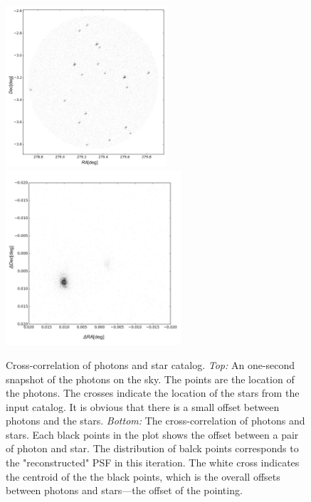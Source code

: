 \documentclass[12pt, preprint]{aastex}
\begin{document}
\begin{figure}[p]
\begin{center}
\includegraphics[width=0.535\textwidth]{figures/photons600-new}
\includegraphics[width=0.58\textwidth]{figures/co600-new}
\end{center}
\caption{%
  \label{slice}
  Cross-correlation of photons and star catalog.
  \emph{Top:}  An one-second snapshot of the photons on the sky. The points are the location of the photons. The crosses indicate the location of the stars from the input catalog. It is obvious that there is a small offset between photons and the stars.
  \emph{Bottom:} The cross-correlation of photons and stars. 
  Each black points in the plot shows the offset between a pair of photon and star.
  The distribution of balck points corresponds to the "reconstructed" PSF in this iteration. 
  The white cross indicates the centroid of the the black points, which is the overall offsets between photons and stars---the offset of the pointing.
  }
\end{figure}
\end{document}
